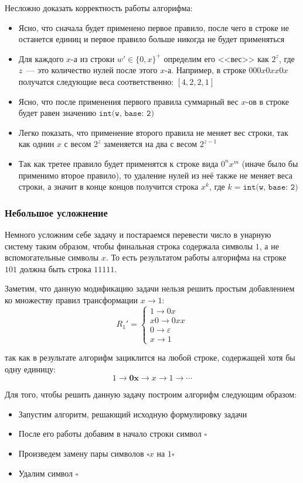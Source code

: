 \documentclass[
    11pt,
    a4paper
]{article}
\theoremstyle{definition}
\begin{document}
Несложно доказать корректность работы алгорифма:
\begin{itemize}
\item Ясно, что сначала будет применено первое правило, после чего в строке не останется единиц и первое правило больше никогда не будет применяться
\item Для каждого $x$-а из строки $w' \in \{0, x\}^+$ определим его <<вес>> как $2^z$, где $z$~--- это количество нулей после этого $x$-а. Например, в строке $000x0xx0x$ получатся следующие веса соответственно: $[4, 2, 2, 1]$
\item Ясно, что после применения первого правила суммарный вес $x$-ов в строке будет равен значению $\texttt{int(w, base: 2)}$
\item Легко показать, что применение второго правила не меняет вес строки, так как однин $x$ с весом $2^z$ заменяется на два с весом $2^{z - 1}$
\item Так как третее правило будет применятся к строке вида $0^nx^m$ (иначе было бы применимо второе правило), то удаление нулей из неё также не меняет веса строки, а значит в конце концов получится строка $x^k$, где $k = \texttt{int(w, base: 2)}$
\end{itemize}

\subsubsection{Небольшое усложнение}

Немного усложним себе задачу и постараемся перевести число в унарную систему таким образом, чтобы финальная строка содержала символы $1$, а не вспомогательные символы $x$. То есть результатом работы алгорифма на строке $101$ должна быть строка $11111$.

Заметим, что данную модификацию задачи нельзя решить простым добавлением ко множеству правил трансформации $x \rightarrow 1$:
$$R_1' = \begin{cases}1 \rightarrow 0x\\x0 \rightarrow 0xx\\ 0 \rightarrow \varepsilon\\x \rightarrow 1\end{cases}$$

так как в результате алгорифм зациклится на любой строке, содержащей хотя бы одну единицу:
$$1 \rightarrow \mathbf{0x} \rightarrow x \rightarrow 1 \rightarrow \cdots$$

Для того, чтобы решить данную задачу построим алгорифм следующим образом:
\begin{itemize}
\item Запустим алгоритм, решающий исходную формулировку задачи
\item После его работы добавим в начало строки символ $\square$
\item Произведем замену пары символов $\square x$ на $1 \square$
\item Удалим символ $\square$
\end{itemize}
\end{document}
